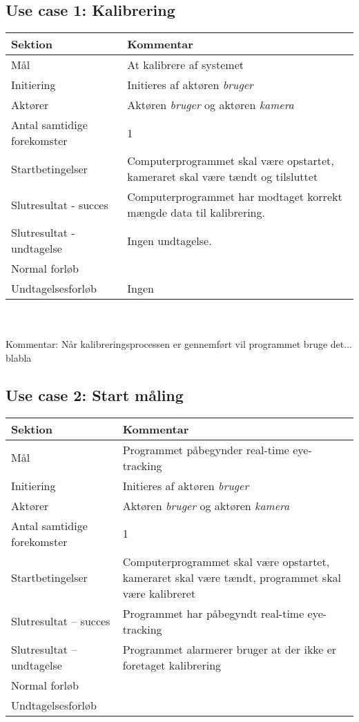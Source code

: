 \documentclass[a4paper,oneside,12pt]{article}
\begin{document}
	\subsection{Use case 1: Kalibrering}
	\begin{tabular}{|l|p{7.7cm}|}
		\hline \textbf{Sektion} & \textbf{Kommentar} \\ 
		\hline Mål & At kalibrere af systemet \\ 
		\hline Initiering & Initieres af aktøren \textit{bruger} \\ 
		\hline Aktører & Aktøren \textit{bruger} og aktøren \textit{kamera} \\ 
		\hline Antal samtidige forekomster & 1 \\ 
		\hline Startbetingelser & Computerprogrammet skal være opstartet, kameraret skal være tændt og tilsluttet \\ 	
		\hline Slutresultat - succes & Computerprogrammet har modtaget korrekt mængde data til kalibrering. \\ 
		\hline Slutresultat - undtagelse &  Ingen undtagelse. \\ 
		\hline Normal forløb &  \\ 
		\hline Undtagelsesforløb & Ingen \\ 
		\hline 
	\end{tabular} \\ \\
	Kommentar: Når kalibreringsprocessen er gennemført vil programmet bruge det... blabla
	
	\subsection{Use case 2: Start måling}
	\begin{tabular}{|l|p{7.7cm}|}
		\hline \textbf{Sektion} 	& \textbf{Kommentar} \\ 
		\hline Mål  & Programmet påbegynder real-time eye-tracking \\ 
		\hline Initiering  & Initieres af aktøren \textit{bruger} \\ 
		\hline Aktører & Aktøren \textit{bruger} og aktøren \textit{kamera} \\ 
		\hline Antal samtidige forekomster & 1 \\ 
		\hline Startbetingelser & Computerprogrammet skal være opstartet, kameraret skal være tændt, programmet skal være kalibreret  \\ 
		\hline Slutresultat – succes & Programmet har påbegyndt real-time eye-tracking \\ 
		\hline Slutresultat – undtagelse & Programmet alarmerer bruger at der ikke er foretaget kalibrering \\ 
		\hline Normal forløb &  \\ 
		\hline Undtagelsesforløb &  \\ 
		\hline 
	\end{tabular}
\end{document}
